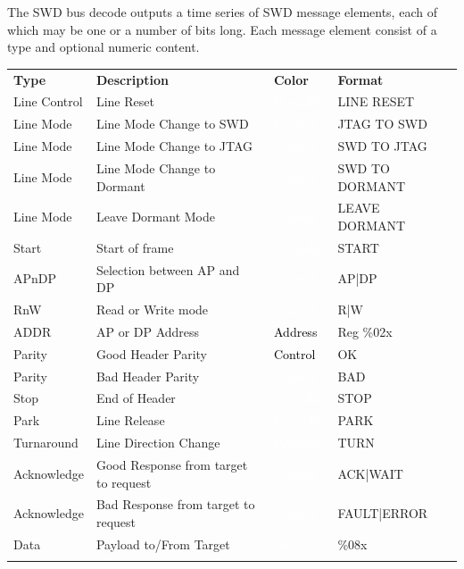 The SWD bus decode outputs a time series of SWD message elements, each of which may be one or a number of bits long.
Each message element consist of a type and optional numeric content.

\begin{tabularx}{16cm}{lllX}
\thickhline
\textbf{Type} & \textbf{Description} & \textbf{Color} & \textbf{Format} \\
\thickhline
Line Control & Line Reset & \cellcolor{preamble}\textcolor{white}{Preamble} & LINE RESET \\
\thinhline
Line Mode & Line Mode Change to SWD & \cellcolor{control}\textcolor{white}{Control} & JTAG TO SWD \\
\thinhline
Line Mode & Line Mode Change to JTAG & \cellcolor{control}\textcolor{white}{Control} & SWD TO JTAG \\
\thinhline
Line Mode & Line Mode Change to Dormant & \cellcolor{control}\textcolor{white}{Control} & SWD TO DORMANT \\
\thinhline
Line Mode & Leave Dormant Mode & \cellcolor{control}\textcolor{white}{Control} & LEAVE DORMANT \\
\thinhline
Start & Start of frame & \cellcolor{preamble}\textcolor{white}{Preamble} & START \\
\thinhline
APnDP & Selection between AP and DP & \cellcolor{control}\textcolor{white}{Control} & AP|DP  \\
\thinhline
RnW & Read or Write mode & \cellcolor{control}\textcolor{white}{Control} & R|W  \\
\thinhline
ADDR & AP or DP Address & \cellcolor{address}\textcolor{black}{Address} & Reg \%02x \\
\thinhline
Parity & Good Header Parity & \cellcolor{green}\textcolor{black}{Control} & OK  \\
\thinhline
Parity & Bad Header Parity & \cellcolor{red}\textcolor{white}{Control} & BAD  \\
\thinhline
Stop & End of Header & \cellcolor{preamble}\textcolor{white}{Preamble} & STOP \\
\thinhline
Park & Line Release & \cellcolor{preamble}\textcolor{white}{Preamble} & PARK \\
\thinhline
Turnaround & Line Direction Change & \cellcolor{preamble}\textcolor{white}{Preamble} & TURN \\
\thinhline
Acknowledge & Good Response from target to request & \cellcolor{control}\textcolor{white}{Control} & ACK|WAIT    \\
\thinhline
Acknowledge & Bad Response from target to request & \cellcolor{control}\textcolor{white}{Control} & FAULT|ERROR    \\
\thinhline
Data & Payload to/From Target & \cellcolor{data}\textcolor{white}{Data} & \%08x \\
\thinhline

\thickhline
\end{tabularx}

